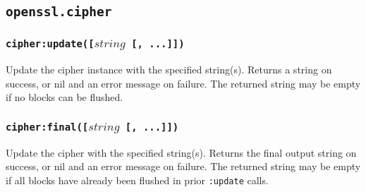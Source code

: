 \documentclass[11pt, oneside]{memoir}
\newcommand*{\fn}[1]{\texttt{#1}\xspace}
\newcounter{toccols}
\newenvironment{Module}[1]{
	\subsection{\texttt{#1}}
	\addtocontents{toc}{
		\protect\begin{multicols}{\value{toccols}}
	}
}{
	\addtocontents{toc}{\protect\end{multicols}}
}
\begin{document}
\begin{Module}{openssl.cipher}
\subsubsection[\fn{cipher:update}]{\fn{cipher:update([$string$ [, ...]])}}

Update the cipher instance with the specified string(s). Returns a string on success, or nil and an error message on failure. The returned string may be empty if no blocks can be flushed.

\subsubsection[\fn{cipher:final}]{\fn{cipher:final([$string$ [, ...]])}}

Update the cipher with the specified string(s). Returns the final output string on success, or nil and an error message on failure. The returned string may be empty if all blocks have already been flushed in prior \fn{:update} calls.

\end{Module}
\end{document}
